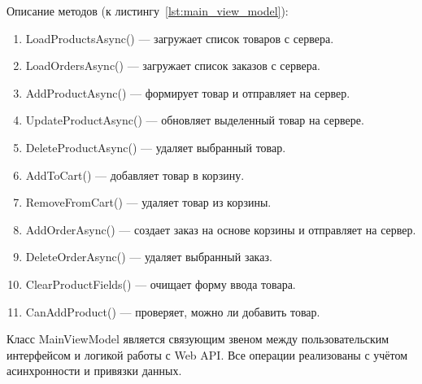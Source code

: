 \documentclass[12pt]{article}
\renewcommand{\texttt}[1]{{\small\ttfamily #1}}
\numberwithin{listing}{section}
\numberwithin{figure}{section}
\begin{document}
\noindent Описание методов (к листингу~\ref{lst:main_view_model}):
\begin{enumerate}
	\item \texttt{LoadProductsAsync()} — загружает список товаров с сервера.
	\item \texttt{LoadOrdersAsync()} — загружает список заказов с сервера.
	\item \texttt{AddProductAsync()} — формирует товар и отправляет на сервер.
	\item \texttt{UpdateProductAsync()} — обновляет выделенный товар на сервере.
	\item \texttt{DeleteProductAsync()} — удаляет выбранный товар.
	\item \texttt{AddToCart()} — добавляет товар в корзину.
	\item \texttt{RemoveFromCart()} — удаляет товар из корзины.
	\item \texttt{AddOrderAsync()} — создает заказ на основе корзины и отправляет на сервер.
	\item \texttt{DeleteOrderAsync()} — удаляет выбранный заказ.
	\item \texttt{ClearProductFields()} — очищает форму ввода товара.
	\item \texttt{CanAddProduct()} — проверяет, можно ли добавить товар.
\end{enumerate}
Класс \texttt{MainViewModel} является связующим звеном между пользовательским интерфейсом и логикой работы с Web API. Все операции реализованы с учётом асинхронности и привязки данных.

\newpage
\end{document}
